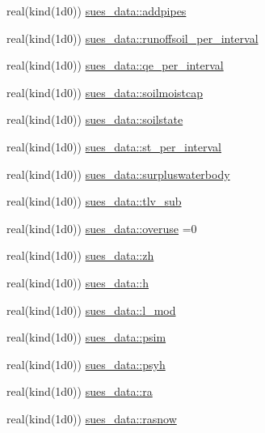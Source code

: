 \begin{DoxyCompactItemize}
\item 
real(kind(1d0)) \hyperlink{namespacesues__data_a58a8108dff93f602ad2ef840fef9395f}{sues\+\_\+data\+::addpipes}
\item 
real(kind(1d0)) \hyperlink{namespacesues__data_ae3658e6cd4c5115a1a9f8ea57cf6f6b1}{sues\+\_\+data\+::runoffsoil\+\_\+per\+\_\+interval}
\item 
real(kind(1d0)) \hyperlink{namespacesues__data_a63a7c6317d6086404efee7da0d9be4da}{sues\+\_\+data\+::qe\+\_\+per\+\_\+interval}
\item 
real(kind(1d0)) \hyperlink{namespacesues__data_ada5a214d0c4d5da587baa5f8de1da6d9}{sues\+\_\+data\+::soilmoistcap}
\item 
real(kind(1d0)) \hyperlink{namespacesues__data_afa546047f4e8bd032736a6915fe1cffd}{sues\+\_\+data\+::soilstate}
\item 
real(kind(1d0)) \hyperlink{namespacesues__data_a2de83c53a6d33bd6f917cf0418fe3d50}{sues\+\_\+data\+::st\+\_\+per\+\_\+interval}
\item 
real(kind(1d0)) \hyperlink{namespacesues__data_ac93567a8ca56d05105523626613f5cc4}{sues\+\_\+data\+::surpluswaterbody}
\item 
real(kind(1d0)) \hyperlink{namespacesues__data_a45028b146a251db48e2682b486211654}{sues\+\_\+data\+::tlv\+\_\+sub}
\item 
real(kind(1d0)) \hyperlink{namespacesues__data_aa663cd30d361709a541de0a9d406557e}{sues\+\_\+data\+::overuse} =0
\item 
real(kind(1d0)) \hyperlink{namespacesues__data_a738f60744a0e91f90a050542ad946898}{sues\+\_\+data\+::zh}
\item 
real(kind(1d0)) \hyperlink{namespacesues__data_ae76235b1ac6a388886f63eb27a0905dd}{sues\+\_\+data\+::h}
\item 
real(kind(1d0)) \hyperlink{namespacesues__data_a7623dce80601c63b78d744b4a5036ad2}{sues\+\_\+data\+::l\+\_\+mod}
\item 
real(kind(1d0)) \hyperlink{namespacesues__data_ab35a12f588d9dfb72d0ec039e806d3bb}{sues\+\_\+data\+::psim}
\item 
real(kind(1d0)) \hyperlink{namespacesues__data_a6d5d62e6767411fff0b1641fe6cbf1f9}{sues\+\_\+data\+::psyh}
\item 
real(kind(1d0)) \hyperlink{namespacesues__data_aafce3a183c34dd4df5268cdbfc8aea24}{sues\+\_\+data\+::ra}
\item 
real(kind(1d0)) \hyperlink{namespacesues__data_a2a84935439f246e72f5de7bd752888f1}{sues\+\_\+data\+::rasnow}
\item 

\end{DoxyCompactItemize}
